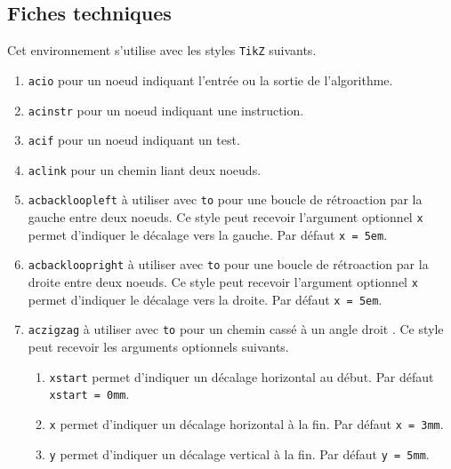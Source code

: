\documentclass[12pt,a4paper]{article}
\begin{document}


\subsection{Fiches techniques}


Cet environnement s'utilise avec les styles \verb#TikZ# suivants.

\begin{enumerate}
	\item \verb#acio# pour un noeud indiquant l'entrée ou la sortie de l'algorithme.

	\item \verb#acinstr# pour un noeud indiquant une instruction.

	\item \verb#acif# pour un noeud indiquant un test.

	\smallskip

	\item \verb#aclink# pour un chemin liant deux noeuds.

	\smallskip

	\item \verb#acbackloopleft# à utiliser avec \verb#to# pour une boucle de rétroaction par la gauche entre deux noeuds.
	      Ce style peut recevoir l'argument optionnel \verb#x# permet d'indiquer le décalage vers la gauche.
		  Par défaut \verb#x = 5em#.

	\item \verb#acbackloopright# à utiliser avec \verb#to# pour une boucle de rétroaction par la droite entre deux noeuds.
	      Ce style peut recevoir l'argument optionnel \verb#x# permet d'indiquer le décalage vers la droite.
		  Par défaut \verb#x = 5em#.

	\smallskip

	\item \verb#aczigzag# à utiliser avec \verb#to# pour un chemin \fg cassé à un angle droit \fg.
	      Ce style peut recevoir les arguments optionnels suivants.
	      \begin{enumerate}
	      		\item \verb#xstart# permet d'indiquer un décalage horizontal au début.
			          Par défaut \verb#xstart = 0mm#.

	      		\item \verb#x# permet d'indiquer un décalage horizontal à la fin.
			          Par défaut \verb#x = 3mm#.

	      		\item \verb#y# permet d'indiquer un décalage vertical à la fin.
			          Par défaut \verb#y = 5mm#.
	      \end{enumerate}
\end{enumerate}
\end{document}
